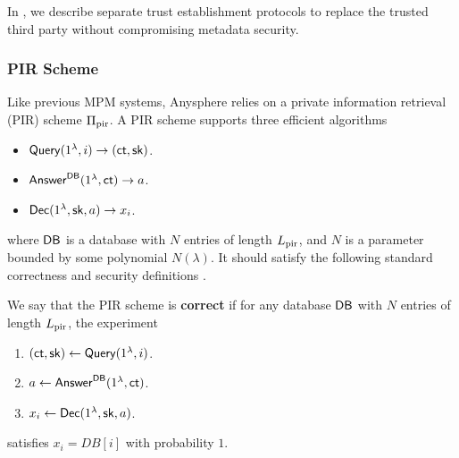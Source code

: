 In \cite[Section 4]{whitepaper}, we describe separate trust establishment protocols to replace the trusted third party without compromising metadata security. 
\subsubsection{PIR Scheme}
\label{subsec:PIR}
Like previous MPM systems, Anysphere relies on a private information retrieval (PIR) scheme $\Pi_{\text{pir}}$. A PIR scheme supports three efficient algorithms
\begin{itemize}
    \item $\mathsf{Query}(1^{\lambda}, i) \to (\mathsf{ct}, {\mathsf{sk}})$.
    \item $\mathsf{Answer}^{\mathsf{DB}}(1^{\lambda}, \mathsf{ct}) \to a$.
    \item $\mathsf{Dec}(1^{\lambda}, {\mathsf{sk}}, a) \to x_i$.
\end{itemize}
where $\mathsf{DB}$ is a database with $N$ entries of length $L_{\text{pir}}$, and $N$ is a parameter bounded by some polynomial $N(\lambda)$. It should satisfy the following standard correctness and security definitions \cite{kushilevitz1997replication}.
\begin{definition}
\label{defn:PIR-correctness}
We say that the PIR scheme is \textbf{correct} if for any database $\mathsf{DB}$ with $N$ entries of length $L_{\text{pir}}$, the experiment
\begin{enumerate}
    \item $(\mathsf{ct}, {\mathsf{sk}}) \leftarrow \mathsf{Query}(1^{\lambda}, i)$.
    \item $a \leftarrow \mathsf{Answer}^{\mathsf{DB}}(1^{\lambda}, \mathsf{ct})$.
    \item $x_i \leftarrow \mathsf{Dec}(1^{\lambda}, {\mathsf{sk}}, a)$.
\end{enumerate}
satisfies $x_i = DB[i]$ with probability $1$.
\end{definition}
